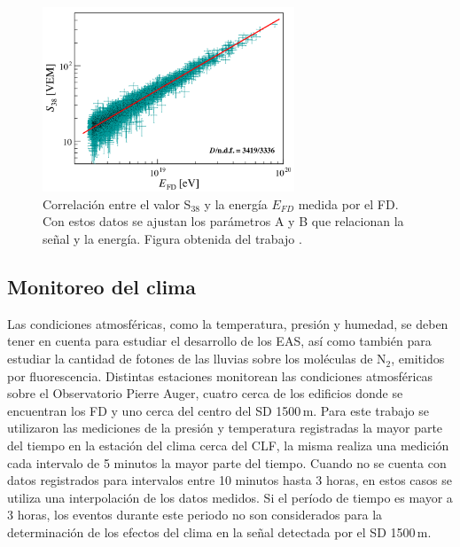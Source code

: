 \begin{figure}[H]
	\centering
	\includegraphics[width=0.67\textwidth]{efd_s38_v2.jpg}
	\caption{Correlación entre el valor S$_{38}$ y la energía $E_{FD}$ medida por el FD. Con estos datos se ajustan los parámetros A y B que relacionan la señal y la energía.  Figura obtenida del trabajo \cite{tobepublished}.} 	\label{fig:efd_s38}
\end{figure}


\subsection{Monitoreo del clima}\label{seccion:clima}

Las condiciones atmosféricas, como la temperatura, presión y humedad, se deben tener en cuenta para estudiar el desarrollo de los EAS, así como también para estudiar la cantidad de fotones de las lluvias sobre los moléculas de N$_2$, emitidos por fluorescencia. Distintas estaciones monitorean las condiciones atmosféricas sobre el Observatorio Pierre Auger, cuatro cerca  de los edificios donde se encuentran los FD y uno cerca del centro del SD 1500\,m. Para este trabajo se utilizaron las mediciones de la presión y temperatura registradas la mayor parte del tiempo en la estación del clima cerca del CLF, la misma realiza una medición cada intervalo de 5 minutos la mayor parte del tiempo. Cuando no se cuenta con datos registrados para intervalos entre 10 minutos hasta 3 horas, en estos casos se utiliza una interpolación de los datos medidos. Si el período de tiempo es mayor a 3 horas, los eventos durante este periodo no son considerados para la determinación de los efectos del clima en la señal detectada por el SD 1500\,m.